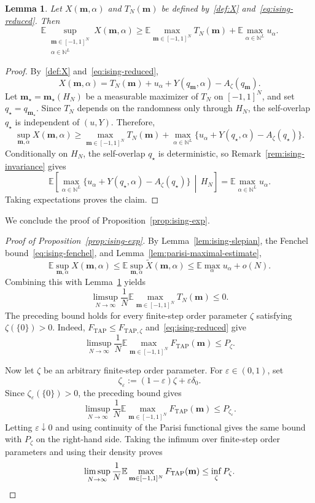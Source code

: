 \documentclass[a4paper,10pt,reqno]{amsart}
\numberwithin{equation}{section}
\newtheorem{lemma}[proposition]{Lemma}%
\newcommand{\dN}{\mathbb{N}}%
\newcommand{\dE}{\mathbb{E}}%
\newcommand{\TAP}{\mathrm{TAP}}
\newcommand{\bfm}{\mathbf{m}}
\begin{document}
	
	\begin{lemma}\label{lem:ising-lower}
		Let $X(\bfm,\alpha)$ and $T_N(\bfm)$ be defined by~\eqref{def:X}
		and~\eqref{eq:ising-reduced}. Then
		\[
		\dE
		\sup_{\substack{\bfm\in[-1,1]^N\\ \alpha\in\dN^L}}
		X(\bfm,\alpha)
		\ge
		\dE\max_{\bfm\in[-1,1]^N}T_N(\bfm)
		+
		\dE\max_{\alpha\in\dN^L}u_\alpha.
		\]
	\end{lemma}
	
	\begin{proof}
		By~\eqref{def:X} and~\eqref{eq:ising-reduced},
		\[
		X(\bfm,\alpha)
		=
		T_N(\bfm)+u_\alpha+Y(q_\bfm,\alpha)-A_\zeta(q_\bfm).
		\]
		Let $\bfm_\star=\bfm_\star(H_N)$ be a measurable maximizer of
		$T_N$ on $[-1,1]^N$, and set $q_\star=q_{\bfm_\star}$. Since
		$T_N$ depends on the randomness only through $H_N$, the self-overlap
		$q_\star$ is independent of $(u,Y)$. Therefore,
		\[
		\sup_{\bfm,\alpha}X(\bfm,\alpha)
		\ge
		\max_{\bfm\in[-1,1]^N}T_N(\bfm)
		+
		\max_{\alpha\in\dN^L}
		\{u_\alpha+Y(q_\star,\alpha)-A_\zeta(q_\star)\}.
		\]
		Conditionally on $H_N$, the self-overlap $q_\star$ is deterministic, so
		Remark~\ref{rem:ising-invariance} gives
		\[
		\dE\left[
		\max_{\alpha\in\dN^L}
		\{u_\alpha+Y(q_\star,\alpha)-A_\zeta(q_\star)\}
		\,\middle|\,H_N
		\right]
		=
		\dE\max_{\alpha\in\dN^L}u_\alpha.
		\]
		Taking expectations proves the claim.
	\end{proof}
	
	We conclude the proof of Proposition~\ref{prop:ising-exp}.
	
	
	\begin{proof}[Proof of Proposition~\ref{prop:ising-exp}]
		By Lemma~\ref{lem:ising-slepian}, the Fenchel bound~\eqref{eq:ising-fenchel}, and
		Lemma~\ref{lem:parisi-maximal-estimate},
		\[
		\dE\sup_{\bfm,\alpha}X(\bfm,\alpha)
		\le
		\dE\sup_{\bfm,\alpha}\widetilde X(\bfm,\alpha)
		\le
		\dE\max_\alpha u_\alpha+o(N).
		\]
		Combining this with Lemma~\ref{lem:ising-lower} yields
		\[
		\limsup_{N\to\infty}
		\frac1N\dE\max_{\bfm\in[-1,1]^N}T_N(\bfm)
		\le 0.
		\]
		The preceding bound holds for every finite-step order parameter
		$\zeta$ satisfying $\zeta(\{0\})>0$. Indeed,
		$F_{\TAP}\le F_{\TAP,\zeta}$ and~\eqref{eq:ising-reduced} give
		\[
		\limsup_{N\to\infty}
		\frac1N\dE\max_{\bfm\in[-1,1]^N}F_{\TAP}(\bfm)
		\le P_\zeta.
		\]
		
		Now let $\zeta$ be an arbitrary finite-step order parameter. For
		$\varepsilon\in(0,1)$, set
		\[
		\zeta_\varepsilon
		:=
		(1-\varepsilon)\zeta+\varepsilon\delta_0.
		\]
		Since $\zeta_\varepsilon(\{0\})>0$, the preceding bound gives
		\[
		\limsup_{N\to\infty}
		\frac1N\dE\max_{\bfm\in[-1,1]^N}F_{\TAP}(\bfm)
		\le P_{\zeta_\varepsilon}.
		\]
		Letting $\varepsilon\downarrow0$ and using continuity of the Parisi
		functional gives the same bound with $P_\zeta$ on the right-hand
		side. Taking the infimum over finite-step order parameters and using
		their density proves
		\[
		\limsup_{N\to\infty}
		\frac1N\dE\max_{\bfm\in[-1,1]^N}F_{\TAP}(\bfm)
		\le\inf_\zeta P_\zeta.
		\qedhere
		\]
	\end{proof}
	
\end{document}
